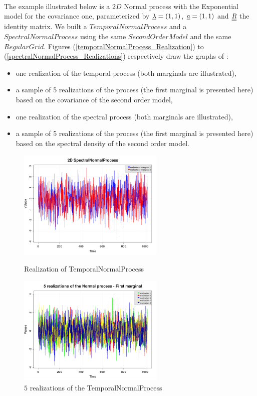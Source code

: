 \textspace\\
The example illustrated below is a $2D$ Normal process with the Exponential model for the covariance one, parameterized by  ${\underline{\lambda}}=(1,1)$, ${\underline{a}}=(1,1)$ and ${\underline{\underline{R}}}$ the identity matrix. We built a $TemporalNormalProcess$ and a $SpectralNormalProcess$ using the same $SecondOrderModel$ and the same $RegularGrid$. Figures (\ref{temporalNormalProcess_Realization}) to (\ref{spectralNormalProcess_Realizations}) respectively draw the graphs of : 
\begin{itemize}
  \item  one realization of the temporal process (both marginals are illustrated),
  \item   a sample of 5 realizations of the process (the first marginal is presented here) based on the covariance of the second order model, 
  \item  one realization of the spectral process (both marginals are illustrated), 
  \item  a sample of 5 realizations of the process (the first marginal is presented here) based on the spectral density of the second order model.
\end{itemize}

\begin{figure}[H]
  \begin{minipage}{9cm}
    \begin{center}
      \includegraphics[width=7cm]{temporalNormal2D_realization.png}
      \caption{Realization of TemporalNormalProcess}
      \label{temporalNormalProcess_Realization}
    \end{center}
  \end{minipage}
  \hfill
  \begin{minipage}{9cm}
    \begin{center}
      \includegraphics[width=7cm]{temporalNormal2D_realizations.png}
      \caption{$5$ realizations of the TemporalNormalProcess}
      \label{temporalNormalProcess_Realizations}
    \end{center}
  \end{minipage}
\end{figure}



